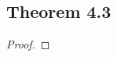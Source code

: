 \documentclass[../../main.tex]{subfiles}
\begin{document}
\subsection{Theorem 4.3}
\begin{wts}

\end{wts}
\begin{proof}

\end{proof}
\end{document}

